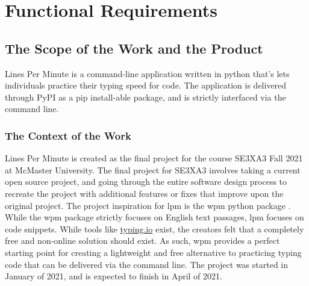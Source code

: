 \documentclass[12pt, titlepage]{article}
\begin{document}
\section{Functional Requirements}

\subsection{The Scope of the Work and the Product}
Lines Per Minute is a command-line application written in python that's lets individuals practice their typing speed for code. The application is delivered through PyPI as a pip install-able package, and is strictly interfaced via the command line.

\subsubsection{The Context of the Work}
Lines Per Minute is created as the final project for the course SE3XA3 Fall 2021 at McMaster University. The final project for SE3XA3 involves taking a current open source project, and going through the entire software design process to recreate the project with additional features or fixes that improve upon the original project. The project inspiration for lpm is the wpm python package \citep{wpm}. \\

While the wpm package strictly focuses on English text passages, lpm focuses on code snippets. While tools like \href{https://typing.io/}{typing.io} exist, the creators felt that a completely free and non-online solution should exist. As such, wpm provides a perfect starting point for creating a lightweight and free alternative to practicing typing code that can be delivered via the command line. The project was started in January of 2021, and is expected to finish in April of 2021.
\end{document}
